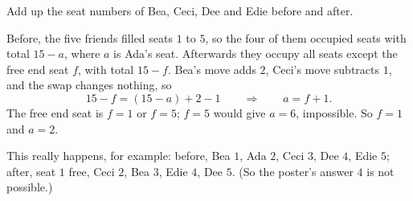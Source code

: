 Add up the seat numbers of Bea, Ceci, Dee and Edie before and after.

Before, the five friends filled seats $1$ to $5$, so the four of them occupied seats with total $15-a$, where $a$ is Ada's seat. Afterwards they occupy all seats except the free end seat $f$, with total $15-f$. Bea's move adds $2$, Ceci's move subtracts $1$, and the swap changes nothing, so
\[
15-f=(15-a)+2-1\qquad\Longrightarrow\qquad a=f+1 .
\]
The free end seat is $f=1$ or $f=5$; $f=5$ would give $a=6$, impossible. So $f=1$ and $a=\boxed{2}$.

This really happens, for example: before, Bea $1$, Ada $2$, Ceci $3$, Dee $4$, Edie $5$; after, seat $1$ free, Ceci $2$, Bea $3$, Edie $4$, Dee $5$. (So the poster's answer $4$ is not possible.)

